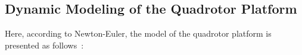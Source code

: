 \documentclass[3p]{elsarticle}
\begin{document}
\subsection{Dynamic Modeling of the Quadrotor Platform}
\noindent Here, according to Newton-Euler, the model of the quadrotor platform is presented as follows~\cite{4399042, article_Bouabdallah}:
\end{document}
